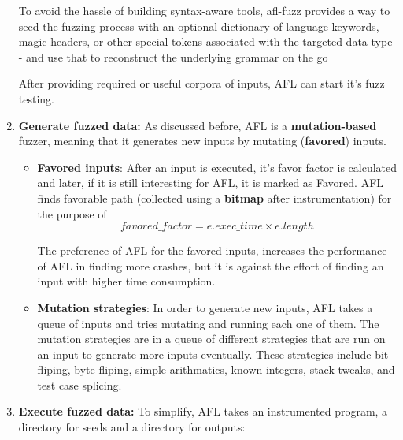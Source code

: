 \begin{enumerate}
{    To avoid the hassle of building syntax-aware tools, afl-fuzz provides a way to seed the fuzzing process with an optional dictionary of language keywords, magic headers, or other special tokens associated with the targeted data type - and use that to reconstruct the underlying grammar on the go}

    After providing required or useful corpora of inputs, AFL can start it's fuzz testing. 
    


    \item \textbf{Generate fuzzed data:}
    As discussed before, AFL is a \textbf{mutation-based} fuzzer, meaning that it generates new inputs by mutating (\textbf{favored}) inputs. 

    \begin{itemize}
        \item \textbf{Favored inputs}: After an input is executed, it's favor factor is calculated and later, if it is still interesting for AFL, it is marked as Favored. AFL finds favorable path (collected using a \textbf{bitmap} after instrumentation) for the purpose of  \cite{afl_git} 
        \begin{equation}
            favored\_factor = e.exec\_time \times e.length
        \end{equation}
        
        The preference of AFL for the favored inputs, increases the performance of AFL in finding more crashes, but it is against the effort of finding an input with higher time consumption.

        \item \textbf{Mutation strategies}: In order to generate new inputs, AFL takes a queue of inputs and tries mutating and running each one of them. The mutation strategies are in a queue of different strategies that are run on an input to generate more inputs eventually. These strategies include bit-fliping, byte-fliping, simple arithmatics, known integers, stack tweaks, and test case splicing. \cite{afl_strategies}
        
    \end{itemize}

    \item \textbf{Execute fuzzed data:}
    To simplify, AFL takes an instrumented program, a directory for seeds and a directory for outputs:


\end{enumerate}
